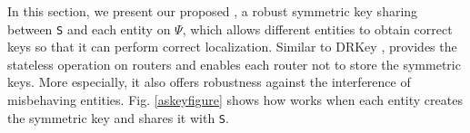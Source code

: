 In this section, we present our proposed \namekey{}, a robust symmetric key sharing between {\tt S} and each entity on $\Psi$, which allows different entities to obtain correct keys so that it can perform correct localization. %
Similar to DRKey \cite{kim2014lightweight}, \namekey{} provides the stateless operation on routers and enables each router not to store the symmetric keys. More especially, it also offers robustness against the interference of misbehaving entities. Fig. \ref{askeyfigure} shows how \namekey{} works when each entity creates the symmetric key and shares it with {\tt S}.
\vspace{-0.1in}
